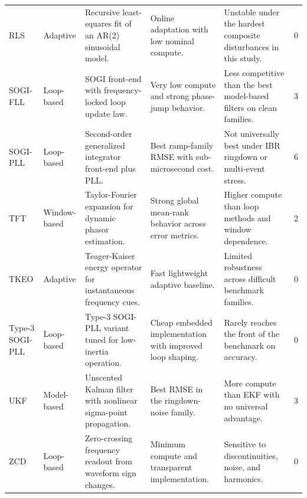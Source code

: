 \begin{longtable}{L{2.25cm} L{1.55cm} L{3.2cm} L{3.6cm} L{3.8cm} c}
RLS & Adaptive & Recursive least-squares fit of an AR(2) sinusoidal model. & Online adaptation with low nominal compute. & Unstable under the hardest composite disturbances in this study. & 0 \\
SOGI-FLL & Loop-based & SOGI front-end with frequency-locked loop update law. & Very low compute and strong phase-jump behavior. & Less competitive than the best model-based filters on clean families. & 3 \\
SOGI-PLL & Loop-based & Second-order generalized integrator front-end plus PLL. & Best ramp-family RMSE with sub-microsecond cost. & Not universally best under IBR ringdown or multi-event stress. & 6 \\
TFT & Window-based & Taylor-Fourier expansion for dynamic phasor estimation. & Strong global mean-rank behavior across error metrics. & Higher compute than loop methods and window dependence. & 2 \\
TKEO & Adaptive & Teager-Kaiser energy operator for instantaneous frequency cues. & Fast lightweight adaptive baseline. & Limited robustness across difficult benchmark families. & 0 \\
Type-3 SOGI-PLL & Loop-based & Type-3 SOGI-PLL variant tuned for low-inertia operation. & Cheap embedded implementation with improved loop shaping. & Rarely reaches the front of the benchmark on accuracy. & 0 \\
UKF & Model-based & Unscented Kalman filter with nonlinear sigma-point propagation. & Best RMSE in the ringdown-noise family. & More compute than EKF with no universal advantage. & 3 \\
ZCD & Loop-based & Zero-crossing frequency readout from waveform sign changes. & Minimum compute and transparent implementation. & Sensitive to discontinuities, noise, and harmonics. & 0 \\
\end{longtable}
